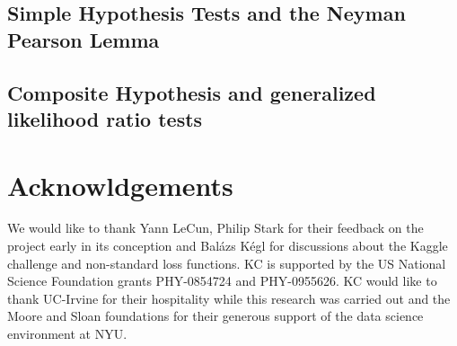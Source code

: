 \documentclass[11pt, oneside]{article}   	%
\begin{document}
\subsection{Simple Hypothesis Tests and the Neyman Pearson Lemma}
\subsection{Composite Hypothesis  and generalized likelihood ratio tests}





\section*{Acknowldgements}
We would like to thank Yann LeCun, Philip Stark for their feedback on the
project early in its conception and Bal\'azs K\'egl for discussions about the Kaggle challenge and 
non-standard loss functions.
KC is supported by the US National Science Foundation grants PHY-0854724 and PHY-0955626. 
KC would like to thank UC-Irvine for their hospitality while this research was carried out and the 
Moore and Sloan foundations for their generous support of the data science environment at NYU.
\end{document}
